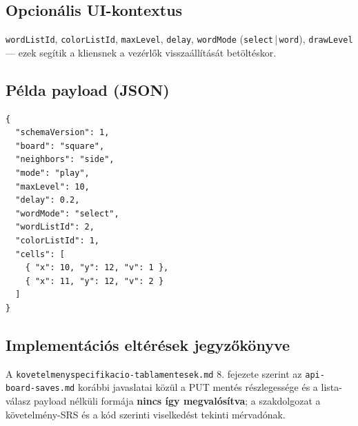 \subsection{Opcionális UI-kontextus}
\texttt{wordListId}, \texttt{colorListId}, \texttt{maxLevel}, \texttt{delay}, \texttt{wordMode} (\texttt{select}\,|\,\texttt{word}), \texttt{drawLevel} — ezek segítik a kliensnek a vezérlők visszaállítását betöltéskor.

\subsection{Példa payload (JSON)}
\begin{lstlisting}[firstnumber=1]
{
  "schemaVersion": 1,
  "board": "square",
  "neighbors": "side",
  "mode": "play",
  "maxLevel": 10,
  "delay": 0.2,
  "wordMode": "select",
  "wordListId": 2,
  "colorListId": 1,
  "cells": [
    { "x": 10, "y": 12, "v": 1 },
    { "x": 11, "y": 12, "v": 2 }
  ]
}
\end{lstlisting}

\subsection{Implementációs eltérések jegyzőkönyve}
A \texttt{kovetelmenyspecifikacio-tablamentesek.md} 8. fejezete szerint az \texttt{api-board-saves.md} korábbi javaslatai közül a PUT mentés részlegessége és a lista-válasz payload nélküli formája \textbf{nincs így megvalósítva}; a szakdolgozat a követelmény-SRS és a kód szerinti viselkedést tekinti mérvadónak.

